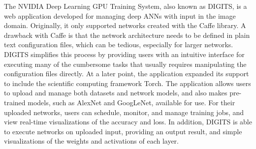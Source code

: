 \begin{comment}
\textit{The NVIDIA Deep Learning GPU Training System, also called DIGITS, is a web application developed for managing deep artificial neural networks created in Caffe, one of the leading programming frameworks for deep learning. A drawback of Caffe is that you need to construct the network architecture of a in plain text configuration files, which can be tedious, especially for large networks. DIGITS provides Caffe users with an intuitive interface for doing many of the cumbersome tasks that usually requires manipulating the configuration files. At a later point, support for the scientific computing framework Torch was also added. The application allows user to upload and manage both datasets and models, and also makes pre-trained models such as AlexNet and GoogLeNet available for use. DIGITS allows user to schedule, monitor, and manage training jobs, as well as analyzing accuracy and loss in real time. In addition, DIGITS allows you to classify images using the fully trained networks, providing simple visualizations of the weights and activations for each layer of the result.} \\

\noindent \textit{It is worth noting that DIGITS has been developed simultaneously to our visualization tool, and its current version is a significant upgrade from the version available when we first started our Specialization Project. DIGITS was an inspirational source to the problem statement, due to it only supporting the use of Caffe and Torch. The developers of DIGITS have previously stated that they are not planning on adding any more frameworks, and as late as April confirmed that they will not support TensorFlow. However, recently they announced on their website that they will be releasing DIGITS with TensorFlow support in July.}
\end{comment}

The NVIDIA Deep Learning GPU Training System, also known as DIGITS, is a web application developed for managing deep ANNs with input in the image domain. Originally, it only supported networks created with the Caffe library. A drawback with Caffe is that the network architecture needs to be defined in plain text configuration files, which can be tedious, especially for larger networks. DIGITS simplifies this process by providing users with an intuitive interface for executing many of the cumbersome tasks that usually requires manipulating the configuration files directly. At a later point, the application expanded its support to include the scientific computing framework Torch. The application allows users to upload and manage both datasets and network models, and also makes pre-trained models, such as AlexNet and GoogLeNet, available for use. For their uploaded networks, users can schedule, monitor, and manage training jobs, and view real-time visualizations of the accuracy and loss. In addition, DIGITS is able to execute networks on uploaded input, providing an output result, and simple visualizations of the weights and activations of each layer. \\

